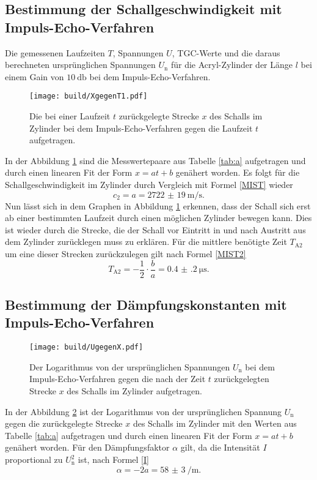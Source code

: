 \subsection{Bestimmung der Schallgeschwindigkeit mit Impuls-Echo-Verfahren}
\begin{table}
	\centering
	\caption{Die gemessenen Laufzeiten $T$, Spannungen $U$, TGC-Werte und die daraus berechneten ursprünglichen Spannungen $U_\text{n}$ für die Acryl-Zylinder der Länge $l$ bei einem Gain von $\SI{10}{\decibel}$ bei dem Impuls-Echo-Verfahren.}
	
\end{table}
\begin{figure}
	\centering
	\caption{Die bei einer Laufzeit $t$ zurückgelegte Strecke $x$ des Schalls im Zylinder bei dem Impuls-Echo-Verfahren gegen die Laufzeit $t$ aufgetragen.}
	\texttt{[image: build/XgegenT1.pdf]}
	\label{fig:XgegenT1}
\end{figure}
In der Abbildung \ref{fig:XgegenT1} sind die Messwertepaare aus Tabelle \ref{tab:a} aufgetragen und durch einen linearen Fit der Form $x=a t + b$ genähert worden.
Es folgt für die Schallgeschwindigkeit im Zylinder durch Vergleich mit Formel \eqref{MIST} wieder
\begin{equation}
	c_2=a=\SI{2722(19)}{\meter\per\second}\text{.}
\end{equation}
Nun lässt sich in dem Graphen in Abbildung \ref{fig:XgegenT1} erkennen, dass der Schall sich erst ab einer bestimmten Laufzeit durch einen möglichen Zylinder bewegen kann. Dies ist wieder durch die Strecke, die der Schall vor Eintritt in und nach Austritt aus dem Zylinder zurücklegen muss zu erklären. Für die mittlere benötigte Zeit $T_{\text{A}2}$ um eine dieser Strecken zurückzulegen gilt nach Formel \eqref{MIST2}
\begin{equation}
	T_{\text{A}2}=-\frac{1}{2} \cdot \frac{b}{a}=\SI{0.4(2)}{\micro\second}\text{.}
\end{equation}

\subsection{Bestimmung der Dämpfungskonstanten mit Impuls-Echo-Verfahren}
\begin{figure}
	\centering
	\caption{Der Logarithmus von der ursprünglichen Spannungen $U_\text{n}$ bei dem Impuls-Echo-Verfahren gegen die nach der Zeit $t$ zurückgelegten Strecke $x$ des Schalls im Zylinder aufgetragen.}
	\texttt{[image: build/UgegenX.pdf]}
	\label{fig:UgegenX}
\end{figure}
In der Abbildung \ref{fig:UgegenX} ist der Logarithmus von der ursprünglichen Spannung $U_\text{n}$ gegen die zurückgelegte Strecke $x$ des Schalls im Zylinder mit den Werten aus Tabelle \ref{tab:a} aufgetragen und durch einen linearen Fit der Form $x=a t + b$ genähert worden. Für den Dämpfungsfaktor $\alpha$ gilt, da die Intensität $I$ proportional zu $U_\text{n}^2$ ist, nach Formel \eqref{I}
\begin{equation}
	\alpha=-2 a = \SI{58(3)}{\per\meter}\text{.}
\end{equation}



